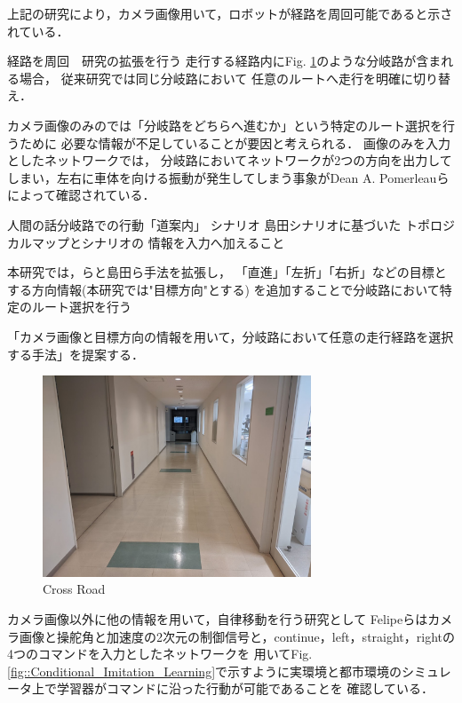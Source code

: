 上記の研究により，カメラ画像用いて，ロボットが経路を周回可能であると示されている．


経路を周回　研究の拡張を行う
走行する経路内にFig. \ref{fig::bunki}のような分岐路が含まれる場合，
従来研究では同じ分岐路において
任意のルートへ走行を明確に切り替え．

カメラ画像のみのでは「分岐路をどちらへ進むか」という特定のルート選択を行うために
必要な情報が不足していることが要因と考えられる．
画像のみを入力としたネットワークでは，
分岐路においてネットワークが2つの方向を出力してしまい，左右に車体を向ける振動が発生してしまう事象がDean A. Pomerleauら\cite{pomeru}によって確認されている．


人間の話分岐路での行動「道案内」
シナリオ
島田シナリオに基づいた
トポロジカルマップとシナリオの
情報を入力へ加えること

本研究では，\cite{okada}らと島田ら手法を拡張し，
「直進」「左折」「右折」などの目標とする方向情報(本研究では"目標方向"とする)
を追加することで分岐路において特定のルート選択を行う

「カメラ画像と目標方向の情報を用いて，分岐路において任意の走行経路を選択する手法」を提案する．
\begin{figure}[h]
    \centering
    \includegraphics[width = 8cm]{./figs/bunki.jpg}
    \caption{Cross Road}
    \label{fig::bunki}
\end{figure}
\newpage

カメラ画像以外に他の情報を用いて，自律移動を行う研究として
Felipeら\cite{razikon}はカメラ画像と操舵角と加速度の2次元の制御信号と，continue，left，straight，rightの4つのコマンドを入力としたネットワークを
用いてFig. \ref{fig::Conditional_Imitation_Learning}で示すように実環境と都市環境のシミュレータ上で学習器がコマンドに沿った行動が可能であることを
確認している．

